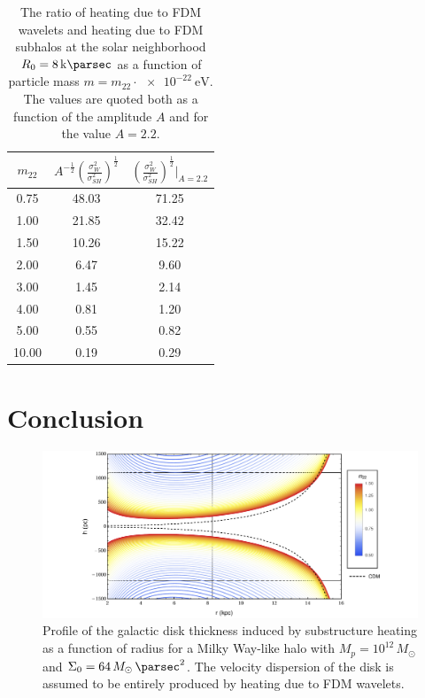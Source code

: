 \documentclass[usenatbib]{mnras}
\begin{document}
\begin{table} \label{FDM_ratio}
\begin{center}
 \begin{tabular}{||c c c||} 
 \hline
 $m_{22}$ & $A^{-\tfrac{1}{2}} \left( \frac{\sigma_{W}^2}{\sigma_{SH}^2} \right)^{\tfrac{1}{2}}$ & $ \left( \frac{\sigma_{W}^2}{\sigma_{SH}^2} \right)^{\tfrac{1}{2}} \bigg|_{A = 2.2}$ \\ [2.5ex] 
 \hline\hline
 0.75 & 48.03 & 71.25 \\ 
 \hline
 1.00 & 21.85 & 32.42 \\
 \hline
 1.50 & 10.26 & 15.22 \\
 \hline
 2.00 & 6.47 & 9.60 \\
 \hline
 3.00 & 1.45 & 2.14 \\
 \hline
 4.00 & 0.81 & 1.20 \\
 \hline
 5.00 & 0.55 & 0.82 \\
 \hline
 10.00 & 0.19 & 0.29 \\ [1ex] 
 \hline
\end{tabular}
\end{center}
\caption{The ratio of heating due to FDM wavelets and heating due to FDM subhalos at the solar neighborhood $R_0 = \SI{8}{\kilo\parsec}$ as a function of particle mass $m = m_{22} \cdot \SI{e-22}{\electronvolt}$. The values are quoted both as a function of the amplitude $A$ and for the value $A = 2.2$. }
\end{table}

\section{Conclusion}

\begin{figure}
\includegraphics[width=18cm]{disk_shape}
\vspace*{-5mm}
\caption{Profile of the galactic disk thickness induced by substructure heating as a function of radius for a Milky Way-like halo with $M_p = 10^{12} \, M_\odot$ and $\Sigma_0 = 64 \, M_\odot \, \si{\per\parsec^2}$. The velocity dispersion of the disk is assumed to be entirely produced by heating due to FDM wavelets. }
\label{fig:disk_shape_FDM}
\end{figure}
\end{document}
